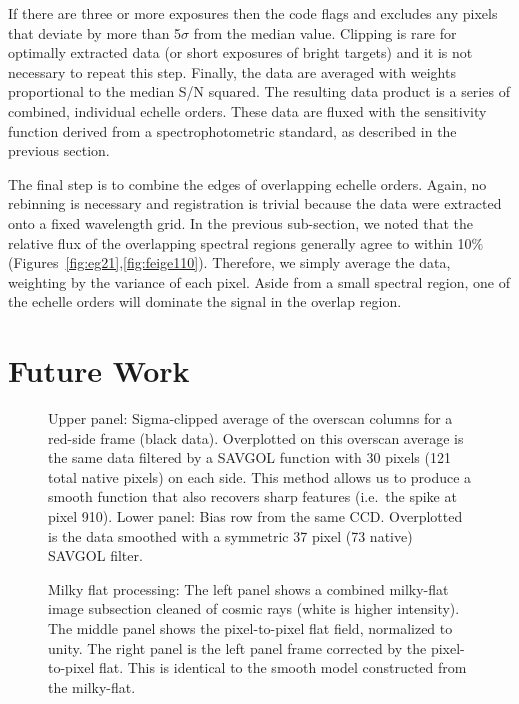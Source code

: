 \documentclass[12pt,preprint]{aastex}
\begin{document}
If there are three or more exposures then the code flags and excludes
any pixels that deviate by more than 5$\sigma$ from the median value.
Clipping is rare for optimally extracted data (or short exposures of bright
targets) and it is not necessary to repeat this step.
Finally, the data are averaged with weights proportional to 
the median S/N squared.
The resulting data product is a series of combined, individual echelle
orders.  These data are fluxed with the sensitivity function derived
from a spectrophotometric standard, as described in the previous section.

The final step is to combine the edges of overlapping echelle orders.
Again, no rebinning is necessary and registration is trivial because
the data were extracted onto a fixed wavelength grid.
In the previous sub-section, we noted that the relative flux of the
overlapping spectral regions generally agree to within 10$\%$
(Figures~\ref{fig:eg21},\ref{fig:feige110}).  Therefore, we simply 
average the data, weighting by the variance of each pixel.
Aside from a small spectral region, one of the echelle orders will
dominate the signal in the overlap region.

\section{Future Work}


\acknowledgments

\clearpage 



\clearpage 
%
%
%

\begin{figure}
\caption{Upper panel: Sigma-clipped average of the overscan columns
for a red-side frame (black data).  Overplotted on this overscan
average is the same data filtered by a SAVGOL function with 30 pixels
(121 total native pixels)
on each side.  This method allows us to produce a smooth function
that also recovers sharp features (i.e.\ the spike at pixel 910).
Lower panel: Bias row from the same CCD.  Overplotted is the 
data smoothed with a symmetric 37 pixel (73 native) SAVGOL filter.
}
\label{fig:bias}
\end{figure}

\begin{figure}
\caption{Milky flat processing: The left panel shows a combined milky-flat
image subsection cleaned of cosmic rays (white is higher intensity).  The
middle panel shows the pixel-to-pixel flat field, normalized to unity.  The
right panel is the left panel frame corrected by the pixel-to-pixel flat.
This is identical to the smooth model constructed from the milky-flat. }
\label{fig:mflat}
\end{figure}
\end{document}
